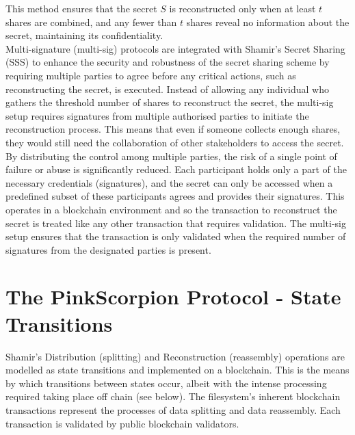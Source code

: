 \documentclass{tufte-handout}
\begin{document}
This method ensures that the secret \( S \) is reconstructed only when at least \( t \) shares are combined, and any fewer than \( t \) shares reveal no information
about the secret, maintaining its confidentiality. \\
\vspace{10pt}
Multi-signature (multi-sig) protocols are integrated with Shamir's Secret Sharing (SSS) to enhance the security and robustness of the secret sharing scheme by requiring
multiple parties to agree before any critical actions, such as reconstructing the secret, is executed. Instead of allowing any individual who gathers the threshold
number of shares to reconstruct the secret, the multi-sig setup requires signatures from multiple authorised parties to initiate the reconstruction process. This
means that even if someone collects enough shares, they would still need the collaboration of other stakeholders to access the secret.\\
\vspace{10pt}
By distributing the control among multiple parties, the risk of a single point of failure or abuse is significantly reduced. Each participant holds only a part of the
necessary credentials (signatures), and the secret can only be accessed when a predefined subset of these participants agrees and provides their signatures. This operates
in a blockchain environment and so the transaction to reconstruct the secret is treated like any other transaction that requires validation. The multi-sig setup ensures
that the transaction is only validated when the required number of signatures from the designated parties is present.\\


\section{The PinkScorpion Protocol - State Transitions}
Shamir's Distribution (splitting) and Reconstruction (reassembly) operations are modelled as state transitions and implemented on a blockchain.
This is the means by which transitions between states occur, albeit with the intense processing required taking place off chain (see below).
The filesystem's inherent blockchain transactions represent the processes of data splitting and data reassembly. Each transaction is validated by public blockchain validators.
\end{document}
